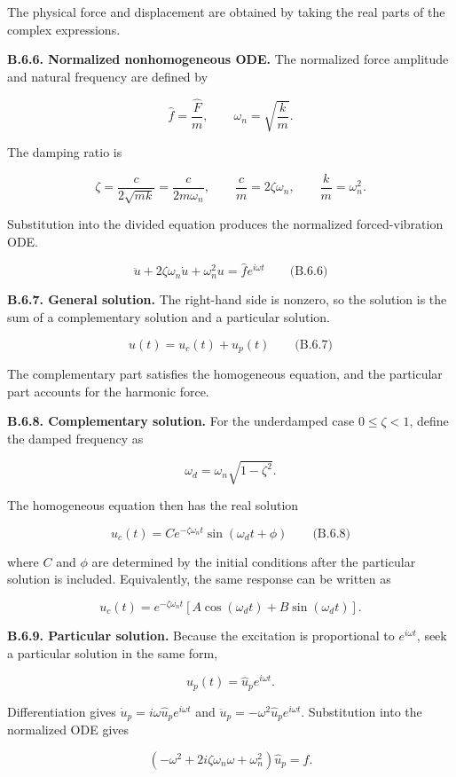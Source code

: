The physical force and displacement are obtained by taking the real parts of the complex expressions.

\textbf{B.6.6. Normalized nonhomogeneous ODE.} The normalized force amplitude and natural frequency are defined by

\[
\hat{f}=\frac{\hat{F}}{m},
\qquad
\omega_n=\sqrt{\frac{k}{m}}.
\]

The damping ratio is

\[
\zeta=\frac{c}{2\sqrt{mk}}=\frac{c}{2m\omega_n},
\qquad
\frac{c}{m}=2\zeta\omega_n,
\qquad
\frac{k}{m}=\omega_n^2.
\]

Substitution into the divided equation produces the normalized forced-vibration ODE.

\[
\boxed{\ddot{u}+2\zeta\omega_n\dot{u}+\omega_n^2u=\hat{f}e^{i\omega t}}
\qquad\text{(B.6.6)}
\]

\textbf{B.6.7. General solution.} The right-hand side is nonzero, so the solution is the sum of a complementary solution and a particular solution.

\[
\boxed{u(t)=u_c(t)+u_p(t)}
\qquad\text{(B.6.7)}
\]

The complementary part satisfies the homogeneous equation, and the particular part accounts for the harmonic force.

\textbf{B.6.8. Complementary solution.} For the underdamped case $0\leq\zeta<1$, define the damped frequency as

\[
\omega_d=\omega_n\sqrt{1-\zeta^2}.
\]

The homogeneous equation then has the real solution

\[
\boxed{u_c(t)=Ce^{-\zeta\omega_nt}\sin(\omega_dt+\phi)}
\qquad\text{(B.6.8)}
\]

where $C$ and $\phi$ are determined by the initial conditions after the particular solution is included. Equivalently, the same response can be written as

\[
u_c(t)=e^{-\zeta\omega_nt}\left[A\cos(\omega_dt)+B\sin(\omega_dt)\right].
\]

\textbf{B.6.9. Particular solution.} Because the excitation is proportional to $e^{i\omega t}$, seek a particular solution in the same form,

\[
u_p(t)=\hat{u}_p e^{i\omega t}.
\]

Differentiation gives $\dot{u}_p=i\omega\hat{u}_p e^{i\omega t}$ and $\ddot{u}_p=-\omega^2\hat{u}_p e^{i\omega t}$. Substitution into the normalized ODE gives

\[
\left(-\omega^2+2i\zeta\omega_n\omega+\omega_n^2\right)\hat{u}_p=\hat{f}.
\]

